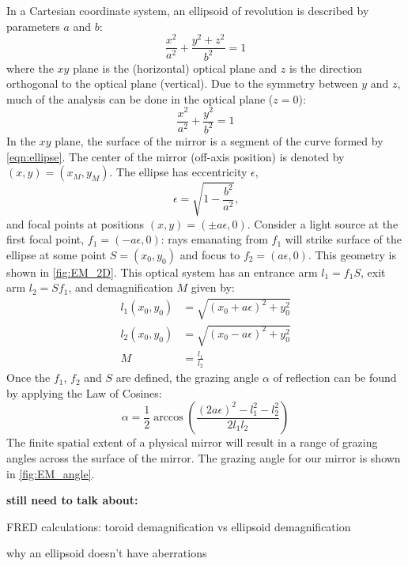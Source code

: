 In a Cartesian coordinate system, an ellipsoid of revolution is described by parameters $a$ and $b$:
\begin{equation}
\frac{x^2}{a^2} + \frac{y^2 + z^2}{b^2} = 1
\end{equation}
where the $xy$ plane is the (horizontal) optical plane and $z$ is the direction orthogonal to the optical plane (vertical). Due to the symmetry between $y$ and $z$, much of the analysis can be done in the optical plane ($z=0$):
\begin{equation}
\frac{x^2}{a^2} + \frac{y^2}{b^2} = 1
\label{eqn:ellipse}
\end{equation}
In the $xy$ plane, the surface of the mirror is a segment of the curve formed by \cref{eqn:ellipse}. The center of the mirror (off-axis position) is denoted by $(x,y)=(x_M, y_M)$. The ellipse has eccentricity $\epsilon$,
\begin{equation}
\epsilon = \sqrt{1-\frac{b^2}{a^2} } \text{,}
\end{equation}
and focal points at positions $(x,y) = (\pm a \epsilon,0)$. Consider a light source at the first focal point,  $f_1 = (-a \epsilon,0)$: rays emanating from $f_1$ will strike surface of the ellipse at some point $S = (x_0, y_0)$ and focus to $f_2 = (a \epsilon,0)$. This geometry is shown in \cref{fig:EM_2D}. This optical system has an entrance arm $l_1 = f_1S$, exit arm $l_2=Sf_1$, and demagnification $M$ given by:
\begin{align}
l_1(x_0, y_0) &= \sqrt{ (x_0+a \epsilon)^2 + y_0^2 } \\
l_2(x_0, y_0) &= \sqrt{ (x_0-a \epsilon)^2 + y_0^2 } \\
M &= \frac{l_1}{l_2}
\end{align}
Once the $f_1$, $f_2$ and $S$ are defined, the grazing angle $\alpha$ of reflection can be found by applying the Law of Cosines:
\begin{equation}
\alpha = \frac{1}{2} \arccos \left( \frac{(2 a \epsilon)^2 - l_1^2 - l_2^2}{2 l_1 l_2} \right)
\end{equation}
The finite spatial extent of a physical mirror will result in a range of grazing angles across the surface of the mirror. The grazing angle for our mirror is shown in \cref{fig:EM_angle}.


\textbf{still need to talk about:}

FRED calculations: toroid demagnification vs ellipsoid demagnification

why an ellipsoid doesn't have aberrations

